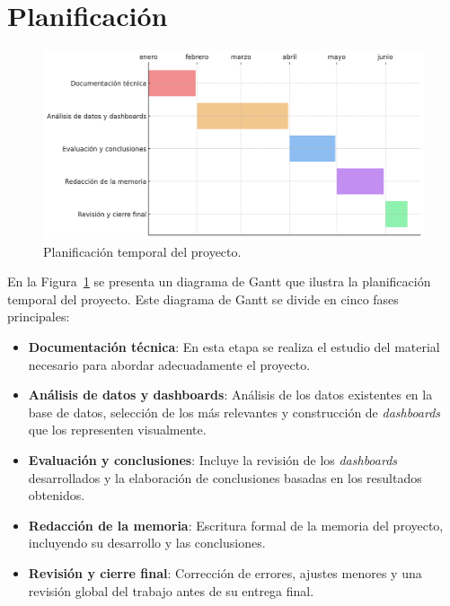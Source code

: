 \documentclass[a4paper, 12pt]{book}
\begin{document}
\section{Planificación}
\label{sec:objetivos}

\begin{figure}[H]
    \centering
    \includegraphics[width=\textwidth]{img/gant.png}
    \caption{Planificación temporal del proyecto.}
    \label{fig:planificacion}
\end{figure}

En la Figura~\ref{fig:planificacion} se presenta un diagrama de Gantt que ilustra la planificación temporal del proyecto. Este diagrama de Gantt se divide en cinco fases principales:

\begin{itemize}
    \item \textbf{Documentación técnica}: En esta etapa se realiza el estudio del material necesario para abordar adecuadamente el proyecto.
    \item \textbf{Análisis de datos y dashboards}: Análisis de los datos existentes en la base de datos, selección de los más relevantes y construcción de \textit{dashboards} que los representen visualmente.
    \item \textbf{Evaluación y conclusiones}: Incluye la revisión de los \textit{dashboards} desarrollados y la elaboración de conclusiones basadas en los resultados obtenidos.
    \item \textbf{Redacción de la memoria}: Escritura formal de la memoria del proyecto, incluyendo su desarrollo y las conclusiones.
    \item \textbf{Revisión y cierre final}: Corrección de errores, ajustes menores y una revisión global del trabajo antes de su entrega final.
\end{itemize}
\end{document}
